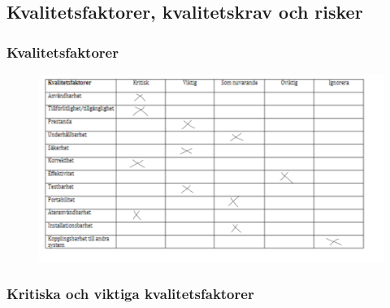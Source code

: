 \documentclass[12pt]{article}
\begin{document}
\subsection{Kvalitetsfaktorer, kvalitetskrav och risker}

\subsubsection{Kvalitetsfaktorer}
\begin{figure}[htp]
    \centering
    \includegraphics[width = 500px]{41.png}
    \label{fig:24}
\end{figure}




\subsubsection{Kritiska och viktiga kvalitetsfaktorer}
\end{document}

